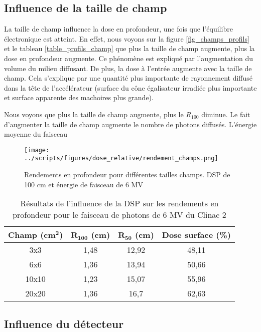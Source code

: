 \documentclass{book}
\begin{document}
\subsection{Influence de la taille de champ}

La taille de champ influence la dose en profondeur, une fois que l'équilibre électronique est atteint. En effet, nous voyons sur la figure \ref*{fig_champs_profils} et le tableau \ref*{table_profils_champ} que plus la taille de champ augmente, plus la dose en profondeur augmente. Ce phénomène est expliqué par l'augmentation du volume du milieu diffusant. De plus, la dose à l'entrée augmente avec la taille de champ. Cela s'explique par une quantité plus importante de rayonnement diffusé dans la tête de l'accélérateur (surface du cône égalisateur irradiée plus importante et surface apparente des machoires plus grande).

Nous voyons que plus la taille de champ augmente, plus le $R_{100}$ diminue. Le fait d'augmenter la taille de champ augmente le nombre de photons diffusés. L'énergie moyenne du faisceau 

\begin{figure}[h!]
  \centering
  \texttt{[image: ../scripts/figures/dose\_relative/rendement\_champs.png]}
  \caption{Rendements en profondeur pour différentes tailles champs. DSP de 100 cm et énergie de faisceau de 6 MV}
  \label{fig_rdt_champ}
\end{figure}

\begin{table}[h]
  \centering
  \begin{tabular}{cccc}
    \toprule
    \textbf{Champ (cm}$\mathbf{^2}$\textbf{)} & $\mathbf{R_{100}}$ \textbf{(cm)} & $\mathbf{R_{50}}$ \textbf{(cm)} & \textbf{Dose surface (\%)} \\
    \toprule
    3x3 & 1,48 & 12,92 & 48,11 \\
    6x6 & 1,36 & 13,94 &  50,66 \\
    10x10 & 1,23 & 15,07 & 55,96 \\
    20x20 & 1,36 & 16,7 & 62,63 \\
    \bottomrule
  \end{tabular}
  \caption{Résultats de l'influence de la DSP sur les rendements en profondeur pour le faisceau de photons de 6 MV du Clinac 2}
  \label{table_rdt_dsp}
\end{table}

\newpage
\subsection{Influence du détecteur}
\end{document}
